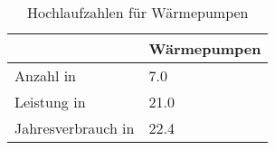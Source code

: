 {
\renewcommand{\arraystretch}{1.2}%
\begin{table}[H]
	\begin{center}
		\caption{Hochlaufzahlen für Wärmepumpen}
		\begin{tabu} to 0.6\textwidth {X[1.5] X[1, r]}
			\toprule
										 & Wärmepumpen \\ \midrule
			Anzahl in \si{\MioStkSC}     & \num{7.0}   \\
			Leistung in \si{\gw}         & \num{21.0}  \\
			Jahresverbrauch in \si{\twh} & \num{22.4}  \\ \bottomrule
		\end{tabu}
		\label{tab:WP-RampUp}
	\end{center}
	\vspace{-3mm}%
\end{table}
}